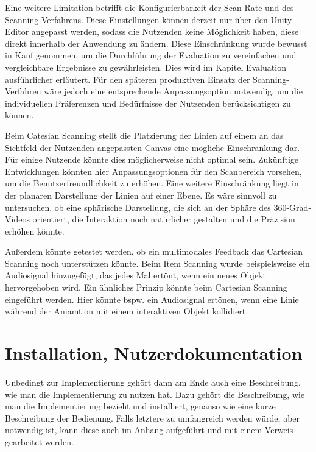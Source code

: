 Eine weitere Limitation betrifft die Konfigurierbarkeit der Scan Rate und des Scanning-Verfahrens. Diese Einstellungen können derzeit nur über den Unity-Editor angepasst werden, sodass die Nutzenden keine Möglichkeit haben, diese direkt innerhalb der Anwendung zu ändern. Diese Einschränkung wurde bewusst in Kauf genommen, um die Durchführung der Evaluation zu vereinfachen und vergleichbare Ergebnisse zu gewährleisten. Dies wird im Kapitel Evaluation ausführlicher erläutert. 
Für den späteren produktiven Einsatz der Scanning-Verfahren wäre jedoch eine entsprechende Anpassungsoption notwendig, um die individuellen Präferenzen und Bedürfnisse der Nutzenden berücksichtigen zu können.

Beim Catesian Scanning stellt die Platzierung der Linien auf einem an das Sichtfeld der Nutzenden angepassten Canvas eine mögliche Einschränkung dar. Für einige Nutzende könnte dies möglicherweise nicht optimal sein. Zukünftige Entwicklungen könnten hier Anpassungsoptionen für den Scanbereich vorsehen, um die Benutzerfreundlichkeit zu erhöhen. Eine weitere Einschränkung liegt in der planaren Darstellung der Linien auf einer Ebene. Es wäre sinnvoll zu untersuchen, ob eine sphärische Darstellung, die sich an der Sphäre des 360-Grad-Videos orientiert, die Interaktion noch natürlicher gestalten und die Präzision erhöhen könnte.

Außerdem könnte getestet werden, ob ein multimodales Feedback das Cartesian Scanning noch unterstützen könnte. Beim Item Scanning wurde beispielsweise ein Audiosignal hinzugefügt, das jedes Mal ertönt, wenn ein neues Objekt hervorgehoben wird. Ein ähnliches Prinzip könnte beim Cartesian Scanning eingeführt werden. Hier könnte bspw. ein Audiosignal ertönen, wenn eine Linie während der Aniamtion mit einem interaktiven Objekt kollidiert. 

\section{Installation, Nutzerdokumentation}

Unbedingt zur Implementierung gehört dann am Ende auch eine Beschreibung, wie man die Implementierung zu nutzen hat. Dazu gehört die Beschreibung, wie man die Implementierung bezieht und installiert, genauso wie eine kurze Beschreibung der Bedienung. Falls letztere zu umfangreich werden würde, aber notwendig ist, kann diese auch im Anhang aufgeführt und mit einem Verweis gearbeitet werden.
